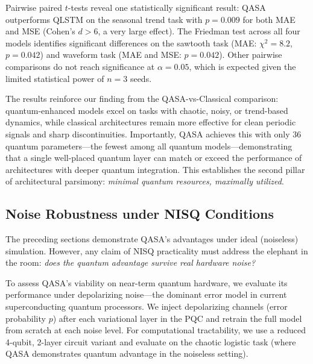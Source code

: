\documentclass[conference]{IEEEtran}
\begin{document}
Pairwise paired $t$-tests reveal one statistically significant result: QASA outperforms QLSTM on the seasonal trend task with $p = 0.009$ for both MAE and MSE (Cohen's $d > 6$, a very large effect). The Friedman test across all four models identifies significant differences on the sawtooth task (MAE: $\chi^2 = 8.2$, $p = 0.042$) and waveform task (MAE and MSE: $p = 0.042$). Other pairwise comparisons do not reach significance at $\alpha = 0.05$, which is expected given the limited statistical power of $n = 3$ seeds.

The results reinforce our finding from the QASA-vs-Classical comparison: quantum-enhanced models excel on tasks with chaotic, noisy, or trend-based dynamics, while classical architectures remain more effective for clean periodic signals and sharp discontinuities. Importantly, QASA achieves this with only 36 quantum parameters---the fewest among all quantum models---demonstrating that a single well-placed quantum layer can match or exceed the performance of architectures with deeper quantum integration. This establishes the second pillar of architectural parsimony: \textit{minimal quantum resources, maximally utilized}.

\subsection{Noise Robustness under NISQ Conditions}

The preceding sections demonstrate QASA's advantages under ideal (noiseless) simulation. However, any claim of NISQ practicality must address the elephant in the room: \emph{does the quantum advantage survive real hardware noise?}

To assess QASA's viability on near-term quantum hardware, we evaluate its performance under depolarizing noise---the dominant error model in current superconducting quantum processors. We inject depolarizing channels (error probability $p$) after each variational layer in the PQC and retrain the full model from scratch at each noise level. For computational tractability, we use a reduced 4-qubit, 2-layer circuit variant and evaluate on the chaotic logistic task (where QASA demonstrates quantum advantage in the noiseless setting).
\end{document}
